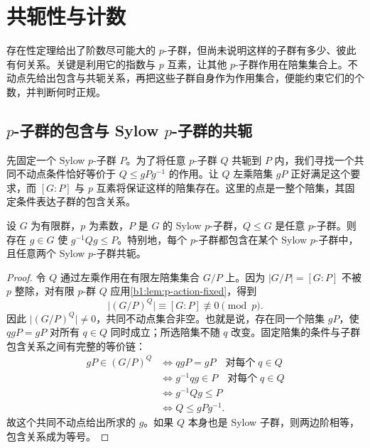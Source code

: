 
\section{共轭性与计数}
\label{b1:sec:0502}

存在性定理给出了阶数尽可能大的 \(p\)-子群，但尚未说明这样的子群有多少、彼此有何关系。关键是利用它的指数与 \(p\) 互素，让其他 \(p\)-子群作用在陪集集合上。不动点先给出包含与共轭关系，再把这些子群自身作为作用集合，便能约束它们的个数，并判断何时正规。


%
%

\subsection{\texorpdfstring{\(p\)}{p}-子群的包含与 Sylow \texorpdfstring{\(p\)}{p}-子群的共轭}
\label{b1:subsec:0502:01}

先固定一个 Sylow \(p\)-子群 \(P\)。为了将任意 \(p\)-子群 \(Q\) 共轭到 \(P\) 内，我们寻找一个共同不动点条件恰好等价于 \(Q\leq gPg^{-1}\) 的作用。让 \(Q\) 左乘陪集 \(gP\) 正好满足这个要求，而 \([G:P]\) 与 \(p\) 互素将保证这样的陪集存在。这里的点是一整个陪集，其固定条件表达子群的包含关系。

\begin{theorem}\label{b1:thm:sylow-conjugacy}
	设 \(G\) 为有限群，\(p\) 为素数，\(P\) 是 \(G\) 的 Sylow \(p\)-子群，\(Q\leq G\) 是任意 \(p\)-子群。则存在 \(g\in G\) 使 \(g^{-1}Qg\leq P\)。特别地，每个 \(p\)-子群都包含在某个 Sylow \(p\)-子群中，且任意两个 Sylow \(p\)-子群共轭。
\end{theorem}

\begin{proof}
	令 \(Q\) 通过左乘作用在有限左陪集集合 \(G/P\) 上。因为 \(|G/P|=[G:P]\) 不被 \(p\) 整除，对有限 \(p\)-群 \(Q\) 应用\cref{b1:lem:p-action-fixed}，得到
	\[
		\bigl|(G/P)^Q\bigr|\equiv[G:P]\not\equiv0\pmod p.
	\]
	因此 \(\bigl|(G/P)^Q\bigr|\ne0\)，共同不动点集合非空。也就是说，存在同一个陪集 \(gP\)，使 \(qgP=gP\) 对所有 \(q\in Q\) 同时成立；所选陪集不随 \(q\) 改变。固定陪集的条件与子群包含关系之间有完整的等价链：
	\[
		\begin{aligned}
			gP\in(G/P)^Q &\Longleftrightarrow qgP=gP\quad\text{对每个}\;q\in Q\\
			&\Longleftrightarrow g^{-1}qg\in P\quad\text{对每个}\;q\in Q\\
			&\Longleftrightarrow g^{-1}Qg\leq P\\
			&\Longleftrightarrow Q\leq gPg^{-1}.
		\end{aligned}
	\]
	故这个共同不动点给出所求的 \(g\)。如果 \(Q\) 本身也是 Sylow 子群，则两边阶相等，包含关系成为等号。
\end{proof}

